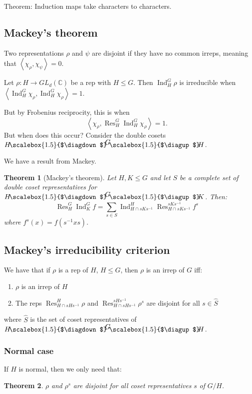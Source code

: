 \documentclass[]{report}
\newtheorem{theorem}{Theorem}
\theoremstyle{definition}
\numberwithin{theorem}{section}
\numberwithin{equation}{section}
\newcommand{\res}{\operatorname{Res}}
\newcommand{\ind}{\operatorname{Ind}}
\newcommand{\doublefaktor}[3]{%
	{\textstyle #1}
	\mkern-4mu\scalebox{1.5}{$\diagdown$}\mkern-5mu^{\textstyle #2}%
	\mkern-4mu\scalebox{1.5}{$\diagup$}\mkern-5mu{\textstyle #3} }
\begin{document}
Theorem: Induction maps take characters to characters. 

\subsection{Mackey's theorem}

Two representations $\rho$ and $\psi$ are disjoint if they have no common irreps, meaning that $\left\langle \chi_\rho, \chi_\psi \right\rangle = 0$. 

Let $\rho: H \rightarrow GL_d(\mathbb{C})$ be a rep with $H \leq G$. Then $\ind^G_H \rho$ is irreducible when 
$\left\langle \ind^G_H \chi_\rho , \ind^G_H \chi_\rho \right \rangle = 1$. 

But by Frobenius reciprocity, this is when
\begin{equation}
	\left\langle \chi_\rho , \res^G_H \ind^G_H \chi_\rho \right \rangle = 1.
\end{equation}
But when does this occur?
Consider the double cosets $\doublefaktor{H}{G}{H}$.

We have a result from Mackey. 
\begin{theorem}[Mackey's theorem]
	Let $H, K \leq G$ and let $S$ be a complete set of double coset representatives for $\doublefaktor{H}{G}{K}$. Then:
	\begin{equation}
		\res^G_H \ind^G_K f = \sum_{s \in S} \ind^H_{H \cap s K s^{-1}} \res^{s K s^{-1}}_{H \cap s K s^{-1}} f^s
	\end{equation}
	where $f^s(x) = f(s^{-1} x s)$. 
\end{theorem}

\subsection{Mackey's irreducibility criterion}

We have that if $\rho$ is a rep of $H$, $H \leq G$, then $\rho$ is an irrep of $G$ iff:
\begin{enumerate}
	\item $\rho$ is an irrep of $H$
	\item The reps $\res^H_{H \cap s H s^{-1}} \rho$ and $\res^{s H s^{-1}}_{H \cap s H s^{-1}} \rho^s$ are disjoint for all $s \in \widehat{S}$
\end{enumerate}
where $\widehat{S}$ is the set of coset representatives of $\doublefaktor{H}{G}{H}$. 

\subsubsection{Normal case}
If $H$ is normal, then we only need that:
\begin{theorem}
	$\rho$ and $\rho^s$  are disjoint for all coset representatives $s$ of $G/H$. 
\end{theorem}
\end{document}
